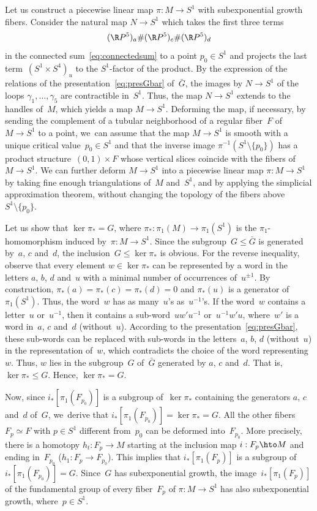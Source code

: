 Let us construct a piecewise linear map $\pi:M \to S^1$ with subexponential growth fibers.
Consider the natural map $N \to S^1$ which takes the first three terms
\[
(\R P^5)_a \# (\R P^5)_c \# (\R P^5)_d
\]
in the connected sum~\eqref{eq:connectedsum} to a point $p_0 \in S^1$ and projects the last term~$(S^1 \times S^4)_u$ to the $S^1$-factor of the product.
By the expression of the relations of the presentation~\eqref{eq:presGbar} of~$\bar{G}$, the images by $N \to S^1$ of the loops $\gamma_1,\dots,\gamma_5$ are contractible in~$S^1$.
Thus, the map $N \to S^1$ extends to the handles of~$M$, which yields a map $M \to S^1$.
Deforming the map, if necessary, by sending the complement of a tubular neighborhood of a regular fiber~$F$ of~$M \to S^1$ to a point, we~can assume that the map $M \to S^1$ is smooth with a unique critical value~$p_0 \in S^1$ and that the inverse image $\pi^{-1}(S^1 \setminus \{p_0\})$ has a product structure~$(0,1) \times F$ whose vertical slices coincide with the fibers of~$M \to S^1$.
We can further deform $M \to S^1$ into a piecewise linear map $\pi:M \to S^1$ by taking fine enough triangulations of~$M$ and~$S^1$, and by applying the simplicial approximation theorem, without changing the topology of the fibers above~$S^1 \setminus \{p_0\}$.

Let us show that $\ker \pi_* = G$, where $\pi_*:\pi_1(M) \to \pi_1(S^1)$ is the $\pi_1$-homomorphism induced by~$\pi:M \to S^1$.
Since the subgroup~$G \leqslant \bar{G}$ is generated by~$a$, $c$ and~$d$, the inclusion~$G \leqslant \ker \pi_*$ is obvious.
For the reverse inequality, observe that every element $w \in \ker \pi_*$ can be represented by a word in the letters $a$, $b$, $d$ and~$u$ with a minimal number of occurrences of~$u^{\pm 1}$.
By construction, $\pi_*(a) = \pi_*(c) = \pi_*(d) = 0$ and $\pi_*(u)$ is a generator of~$\pi_1(S^1)$.
Thus, the word~$w$ has as many~$u$'s as~$u^{-1}$'s.
If the word~$w$ contains a letter~$u$ or~$u^{-1}$, then it contains a sub-word~$uw'u^{-1}$ or~$u^{-1}w'u$, where~$w'$ is a word in~$a$, $c$ and~$d$ (without~$u$).
According to the presentation~\eqref{eq:presGbar}, these sub-words can be replaced with sub-words in the letters~$a$, $b$, $d$ (without~$u$) in the representation of~$w$, which contradicts the choice of the word representing~$w$.
Thus, $w$ lies in the subgroup~$G$ of~$\bar{G}$ generated by $a$, $c$ and~$d$.
That is, $\ker \pi_* \leqslant G$.
Hence, $\ker \pi_* =G$.

Now, since $i_*[\pi_1(F_{p_0})]$ is a subgroup of~$\ker \pi_*$ containing the generators $a$, $c$ and~$d$ of~$G$, we~derive that $i_*[\pi_1(F_{p_0})] = \ker \pi_* = G$.
All the other fibers~$F_p \simeq F$ with $p \in S^1$ different from~$p_0$ can be deformed into~$F_{p_0}$.
More precisely, there is a homotopy $h_t:F_p \to M$ starting at the inclusion map $i:F_p \hto M$ and ending in~$F_{p_0}$ \hbox{(\ie $h_1:F_p \to F_{p_0}$)}.
This implies that $i_*[\pi_1(F_p)]$ is a subgroup of~$i_*[\pi_1(F_{p_0})] = G$.
Since~$G$ has subexponential growth, the image~$i_*[\pi_1(F_p)]$ of the fundamental group of every fiber~$F_p$ of $\pi:M \to S^1$ has also subexponential growth, where~$p \in S^1$.

